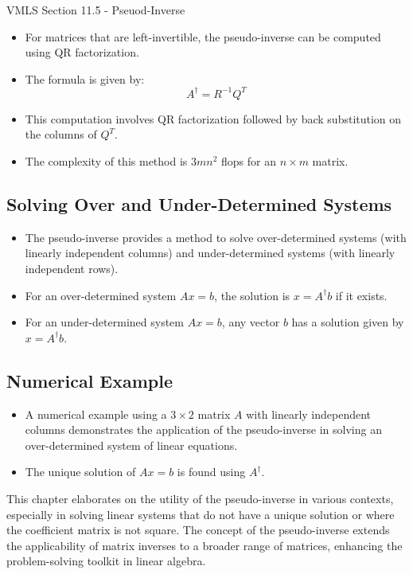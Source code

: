 \begin{notes}{VMLS Section 11.5 - Pseuod-Inverse}
    \begin{highlight}
        \begin{itemize}
            \item For matrices that are left-invertible, the pseudo-inverse can be computed using QR factorization.
            \item The formula is given by:
            \begin{equation*}
                A^\dagger = R^{-1}Q^T
            \end{equation*}
            \item This computation involves QR factorization followed by back substitution on the columns of $Q^T$.
            \item The complexity of this method is $3mn^2$ flops for an $n \times m$ matrix.
        \end{itemize}
    \end{highlight}
    
    \subsection*{Solving Over and Under-Determined Systems}
    \begin{itemize}
        \item The pseudo-inverse provides a method to solve over-determined systems (with linearly independent columns) and under-determined systems (with linearly independent rows).
        \item For an over-determined system $Ax = b$, the solution is $x = A^\dagger b$ if it exists.
        \item For an under-determined system $Ax = b$, any vector $b$ has a solution given by $x = A^\dagger b$.
    \end{itemize}
    
    \subsection*{Numerical Example}
    \begin{itemize}
        \item A numerical example using a $3 \times 2$ matrix $A$ with linearly independent columns demonstrates the application of the pseudo-inverse in solving an over-determined system of linear equations.
        \item The unique solution of $Ax = b$ is found using $A^\dagger$.
    \end{itemize}
    
    This chapter elaborates on the utility of the pseudo-inverse in various contexts, especially in solving linear systems that do not have a unique solution or where the coefficient matrix is not 
    square. The concept of the pseudo-inverse extends the applicability of matrix inverses to a broader range of matrices, enhancing the problem-solving toolkit in linear algebra.
\end{notes}